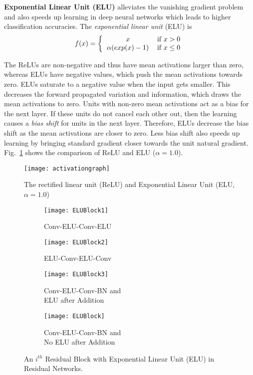 \documentclass[10pt,twocolumn,letterpaper]{article}
\begin{document}
\textbf{Exponential Linear Unit (ELU)} \cite{[9]} alleviates the vanishing gradient problem and also speeds up learning in deep neural networks which leads to higher classification accuracies. The \emph{exponential linear unit} (ELU) is
\[ f(x) = \bigg \{ \begin{tabular}{cc}
$x$ & if $x > 0$ \\
$\alpha (exp(x)-1)$ & if $x \leq 0$
\end{tabular} \]


The ReLUs are non-negative and thus have mean activations larger than zero, whereas ELUs have negative values, which push the mean activations towards zero. ELUs saturate to a negative value when the input gets smaller. This decreases the forward propagated variation and information, which draws the mean activations to zero. Units with non-zero mean activations act as a bias for the next layer. If these units do not cancel each other out, then the learning causes a \emph{bias shift} for units in the next layer. Therefore, ELUs decrease the bias shift as the mean activations are closer to zero. Less bias shift also speeds up learning by bringing standard gradient closer towards the unit natural gradient. Fig.~\ref{fig:elu} shows the comparison of ReLU and ELU ($\alpha=1.0$).

\begin{figure}
\centering
\texttt{[image: activationgraph]}
\caption{The rectified linear unit (ReLU) and Exponential Linear Unit (ELU, $\alpha = 1.0$)}
\label{fig:elu}
\end{figure}



\begin{figure*}
    \centering
    \begin{subfigure}{.24\linewidth}
        \centering
        \texttt{[image: ELUBlock1]}
        \caption{Conv-ELU-Conv-ELU}
        \label{fig:Conv-ELU-Conv-ELU}
    \end{subfigure}
    \begin{subfigure}{.24\linewidth}
        \centering
        \texttt{[image: ELUBlock2]}
        \caption{ELU-Conv-ELU-Conv}
        \label{fig:ELU-Conv-ELU-Conv}
    \end{subfigure}
    \begin{subfigure}{.24\linewidth}
        \centering
        \texttt{[image: ELUBlock3]}
        \caption{Conv-ELU-Conv-BN and \\ ELU after Addition}
        \label{fig:Conv-ELU-Conv-BN1}
    \end{subfigure}
    \begin{subfigure}{.24\linewidth}
        \centering
        \texttt{[image: ELUBlock]}
        \caption{Conv-ELU-Conv-BN and \\ No ELU after Addition}
        \label{fig:Conv-ELU-Conv-BN2}
    \end{subfigure}
    \caption{An \(i^{th}\) Residual Block with Exponential Linear Unit (ELU) in Residual Networks.}
    \label{fig:ELUBlocks}
\end{figure*}
\end{document}
